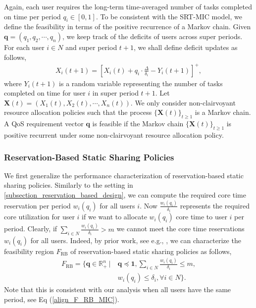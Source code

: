 \documentclass[prodmode,acmtompecs]{acmsmall}
\newcommand{\reqvec}{\mathbf{q}}
\newcommand{\reqscalar}{q}
\newcommand{\feasibilityRegion}{F}
\newcommand{\fullUserSet}{N}
\begin{document}
Again, each user requires the long-term time-averaged number of tasks completed on time per period $\reqscalar_i \in [0, 1]$. To be consistent with the SRT-MIC  model, we define the feasibility in terms of the positive recurrence of a Markov chain. Given $\reqvec = (\reqscalar_1, \reqscalar_2, \cdots, \reqscalar_n)$, we keep track of the deficits of users across super periods. For each user $i\in \fullUserSet$ and super period $t+1$, we shall define deficit updates as follows,
\begin{align}
\label{align_deficit_diff_periods}
X_i(t+1) = [X_i(t) + q_i \cdot \frac{\Delta}{\delta_i} - Y_i(t+1)]^+, 
\end{align}
where $Y_i(t+1)$ is a random variable representing the number of tasks completed on time for user $i$ in super period $t+1$. Let $\mathbf{X}(t) = (X_1(t), X_2(t), \cdots, X_n(t) )$. We only consider non-clairvoyant resource allocation policies such that the process $\{\mathbf{X}(t)\}_{t\geq 1}$ is a Markov chain. A QoS requirement vector $\reqvec$ is feasible if the Markov chain $\{\mathbf{X}(t)\}_{t\geq 1}$ is positive recurrent under some non-clairvoyant resource allocation policy. 

\subsubsection{Reservation-Based Static Sharing Policies}

We first generalize the performance characterization of reservation-based static sharing policies. Similarly to the setting in {\ref{subsection_reservation_based_design}}, we can compute the required core time reservation per period $w_i(\reqscalar_i)$ for all users $i$. Now $\frac{w_i(\reqscalar_i)}{\delta_i}$ represents the required core utilization for user $i$ if we want to allocate $w_i(\reqscalar_i)$ core time to user $i$ per period. Clearly, if $\sum\limits_{i\in \fullUserSet} \frac{w_i(\reqscalar_i)}{\delta_i} > m$ we cannot meet the core time reservations $w_i(\reqscalar_i)$ for all users. Indeed, by prior work, see e.g., \cite{CRJ06,DaB11}, we can characterize the feasibility region $\feasibilityRegion_{\text{RB}}$ of reservation-based static sharing policies as follows, 
\begin{align*}
\feasibilityRegion_{\text{RB}} = \{ \reqvec \in \mathbb R^n_+ ~|~ & \reqvec \preceq \mathbf{1}, \sum\limits_{i \in \fullUserSet} \frac{w_i(q_i)}{\delta_i} \leq m, 	\\
& w_i(q_i) \leq \delta_i, \forall i \in \fullUserSet \}. 
\end{align*}
Note that this is consistent with our analysis when all users have the same period, see Eq (\ref{align_F_RB_MIC}). 
\end{document}
